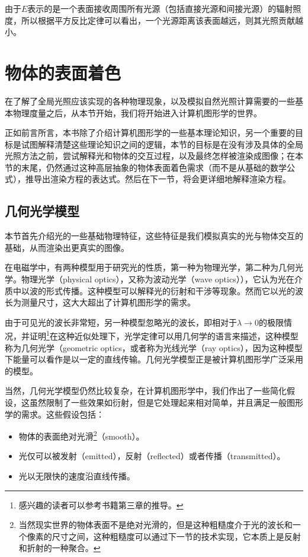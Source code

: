 由于$E$表示的是一个表面接收周围所有光源（包括直接光源和间接光源）的辐射照度，所以根据平方反比定律可以看出，一个光源距离该表面越远，则其光照贡献越小。









\section{物体的表面着色}
在了解了全局光照应该实现的各种物理现象，以及模拟自然光照计算需要的一些基本物理度量之后，从本节开始，我们将开始进入计算机图形学的世界。

正如前言所言，本书除了介绍计算机图形学的一些基本理论知识，另一个重要的目标是试图解释清楚这些理论知识之间的逻辑，本节的目标是在没有涉及具体的全局光照方法之前，尝试解释光和物体的交互过程，以及最终怎样被渲染成图像；在本节的末尾，仍然通过这种高层抽象的物体表面着色需求（而不是从基础的数学公式），推导出渲染方程的表达式。然后在下一节，将会更详细地解释渲染方程。




\subsection{几何光学模型} 
本节首先介绍光的一些基础物理特征，这些特征是我们模拟真实的光与物体交互的基础，从而渲染出更真实的图像。

在电磁学中，有两种模型用于研究光的性质，第一种为物理光学，第二种为几何光学。物理光学（physical optics），又称为波动光学（wave optics）），它认为光在介质中以波的形式传播。这种模型可以解释光的衍射和干涉等现象。然而它以光的波长为测量尺寸，这大大超出了计算机图形学的需求。

由于可见光的波长非常短，另一种模型忽略光的波长，即相对于$\lambda\to 0$的极限情况，并证明\footnote{感兴趣的读者可以参考书籍\cite{b:PrinciplesofOptics}第三章的推导。}在这种近似处理下，光学定律可以用几何学的语言来描述，这种模型称为几何光学（geometric optics，或者称为光线光学（ray optics），因为这种模型下能量可以看作是以一定的直线传输。几何光学模型正是被计算机图形学广泛采用的模型。

当然，几何光学模型仍然比较复杂，在计算机图形学中，我们作出了一些简化假设，这虽然限制了一些效果如衍射，但是它处理起来相对简单，并且满足一般图形学的需求。这些假设包括：

\begin{itemize}
	\item 物体的表面绝对光滑\footnote{当然现实世界的物体表面不是绝对光滑的，但是这种粗糙度介于光的波长和一个像素的尺寸之间，这种粗糙度可以通过下一节的技术实现，它本质上是反射和折射的一种聚合。}（smooth）。
	\item 光仅可以被发射（emitted），反射（reflected）或者传播（transmitted）。
	\item 光以无限快的速度沿直线传播。
\end{itemize} 

